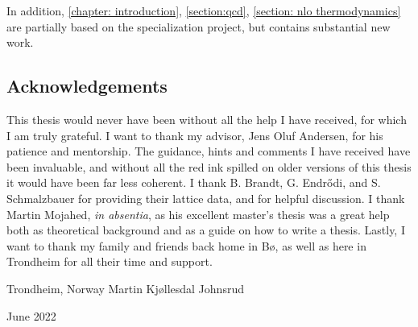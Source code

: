 In addition, \autoref{chapter: introduction}, \autoref{section:qcd}, \autoref{section: nlo thermodynamics} are partially based on the specialization project, but contains substantial new work.


\subsection*{Acknowledgements}


This thesis would never have been without all the help I have received, for which I am truly grateful.
I want to thank my advisor, Jens Oluf Andersen, for his patience and mentorship.
The guidance, hints and comments I have received have been invaluable, and without all the red ink spilled on older versions of this thesis it would have been far less coherent.
I thank B. Brandt, G. Endr\H{o}di, and S. Schmalzbauer for providing their lattice data, and for helpful discussion.
I thank Martin Mojahed, \emph{in absentia}, as his excellent master's thesis was a great help both as theoretical background and as a guide on how to write a thesis.
Lastly, I want to thank my family and friends back home in Bø, as well as here in Trondheim for all their time and support.


\vspace*{\fill}

{
    \noindent
    Trondheim, Norway \hfill Martin Kjøllesdal Johnsrud

    \noindent
    June 2022
}